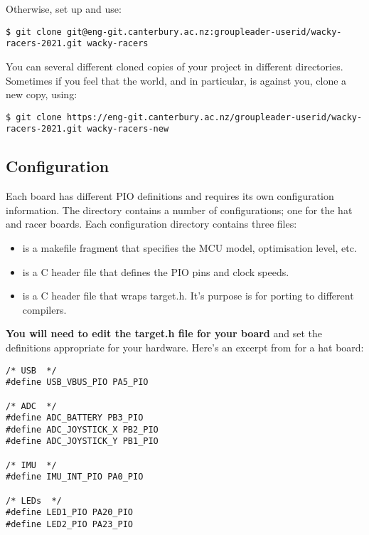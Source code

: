 Otherwise, set up  and use:
%
\begin{verbatim}
$ git clone git@eng-git.canterbury.ac.nz:groupleader-userid/wacky-racers-2021.git wacky-racers
\end{verbatim}

You can several different cloned copies of your project in different
directories. Sometimes if you feel that the world, and  in
particular, is against you, clone a new copy, using:


\begin{verbatim}
$ git clone https://eng-git.canterbury.ac.nz/groupleader-userid/wacky-racers-2021.git wacky-racers-new
\end{verbatim}

\subsection{Configuration}
\label{configuration}

Each board has different PIO definitions and requires its own
configuration information. The 
directory contains a number of configurations; one for the hat and racer
boards. Each configuration directory contains three files:

\begin{itemize}
\item
   is a makefile fragment that specifies the MCU model,
  optimisation level, etc.
\item
   is a C header file that defines the PIO pins and
  clock speeds.
\item
   is a C header file that wraps target.h. It's purpose
  is for porting to different compilers.
\end{itemize}

\textbf{You will need to edit the target.h file for your board} and set
the definitions appropriate for your hardware. Here's an excerpt from
 for a hat board:

\begin{verbatim}
/* USB  */
#define USB_VBUS_PIO PA5_PIO

/* ADC  */
#define ADC_BATTERY PB3_PIO
#define ADC_JOYSTICK_X PB2_PIO
#define ADC_JOYSTICK_Y PB1_PIO

/* IMU  */
#define IMU_INT_PIO PA0_PIO

/* LEDs  */
#define LED1_PIO PA20_PIO
#define LED2_PIO PA23_PIO
\end{verbatim}

